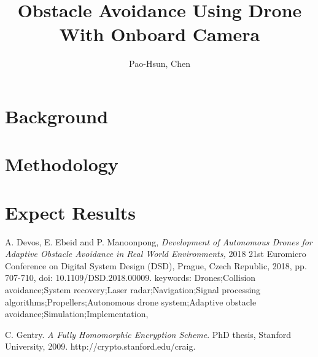 \documentclass[]{article}
\title{Obstacle Avoidance Using Drone With Onboard Camera}
\author{Pao-Hsun, Chen}
\begin{document}
	
	\maketitle
	
	\section{Background}
	
	\section{Methodology}
	
	\section{Expect Results}
	
	
	\begin{thebibliography}{1}
		
		A. Devos, E. Ebeid and P. Manoonpong, \emph{Development of Autonomous Drones for Adaptive Obstacle Avoidance in Real World Environments,} 2018 21st Euromicro Conference on Digital System Design (DSD), Prague, Czech Republic, 2018, pp. 707-710, doi: 10.1109/DSD.2018.00009. keywords: {Drones;Collision avoidance;System recovery;Laser radar;Navigation;Signal processing algorithms;Propellers;Autonomous drone system;Adaptive obstacle avoidance;Simulation;Implementation},
		
		
		
		C. Gentry. \emph{A Fully Homomorphic Encryption Scheme}. PhD thesis, Stanford University, 2009. http://crypto.stanford.edu/craig.
		
	\end{thebibliography}
	
\end{document}
